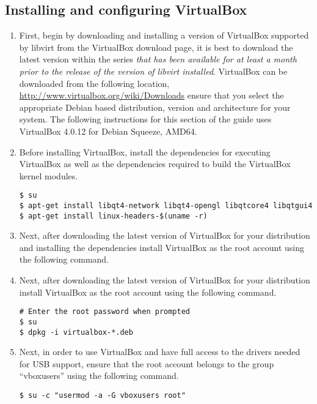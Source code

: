 \subsection{Installing and configuring VirtualBox}
\label{sec:debianvbox}
\begin{enumerate}
\item	First, begin by downloading and installing a version of VirtualBox supported by libvirt from the VirtualBox download 
		page, it is best to download the latest version within the series \emph{that has been available for at least a month 
		prior to the release of the version of libvirt installed}. VirtualBox can be downloaded from the following location,  
		\url{http://www.virtualbox.org/wiki/Downloads} ensure that you select the appropriate Debian based distribution, 
		version and architecture for your system. The following instructions for this section of the guide uses VirtualBox 
		4.0.12 for Debian Squeeze, AMD64.
		
\item	Before installing VirtualBox, install the dependencies for executing VirtualBox as well as the dependencies 
			required to build the VirtualBox kernel modules.

\lstset{language=bash,caption=Install VirtualBox Dependencies}
\begin{lstlisting}
$ su
$ apt-get install libqt4-network libqt4-opengl libqtcore4 libqtgui4
$ apt-get install linux-headers-$(uname -r)
\end{lstlisting}
		 	
\item	Next, after downloading the latest version of VirtualBox for your distribution and installing the dependencies 
			install VirtualBox as the root account using the following command.
\item	Next, after downloading the latest version of VirtualBox for your distribution install VirtualBox as the root
		account using the following command.
\begin{lstlisting}
# Enter the root password when prompted
$ su
$ dpkg -i virtualbox-*.deb
\end{lstlisting}	

\item	Next, in order to use VirtualBox and have full access to the drivers needed for USB support, ensure that the root
			account belongs to the group ``vboxusers'' using the following command.
		
\lstset{language=bash,caption=Add root to VirtualBox Group}
\begin{lstlisting}
$ su -c "usermod -a -G vboxusers root"
\end{lstlisting}	
		

\end{enumerate}

